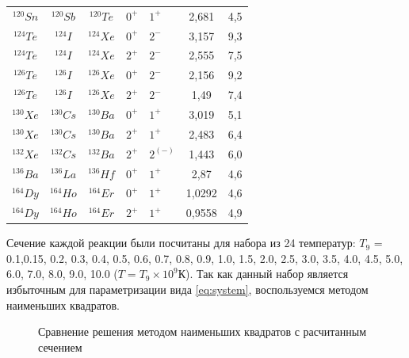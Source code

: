 \documentclass[14pt, a4paper]{article}
\numberwithin{figure}{section}
\numberwithin{equation}{section}
\begin{document}
\begin{table}
\begin{tabular}{|c|c|c|HHc|c|}
		$^{120}Sn$ & $^{120}Sb$ &$^{120}Te$& $0^+$  &  $1^+$  & 2,681 &   4,5   \\
		$^{124}Te$ & $^{124}I$  &$^{124}Xe$& $0^+$  &  $2^-$  & 3,157 &   9,3   \\
		$^{124}Te$ & $^{124}I$  &$^{124}Xe$& $2^+$  &  $2^-$  & 2,555 &   7,5   \\
		$^{126}Te$ & $^{126}I$  &$^{126}Xe$& $0^+$  &  $2^-$  & 2,156 &   9,2   \\
		$^{126}Te$ & $^{126}I$ &$^{126}Xe$ & $2^+$  &  $2^-$  & 1,49 &   7,4   \\
		$^{130}Xe$ & $^{130}Cs$ &$^{130}Ba$& $0^+$  &  $1^+$  & 3,019 &   5,1   \\
		$^{130}Xe$ & $^{130}Cs$ &$^{130}Ba$& $2^+$  &  $1^+$  & 2,483 &   6,4   \\
		$^{132}Xe$ & $^{132}Cs$ &$^{132}Ba$& $2^+$  &  $2^{(-)}$  & 1,443 &   6,0   \\
		$^{136}Ba$ & $^{136}La$ &$^{136}Hf$& $0^+$  &  $1^+$  & 2,87 &   4,6   \\
		$^{164}Dy$ & $^{164}Ho$ &$^{164}Er$& $0^+$  &  $1^+$  & 1,0292 &   4,6   \\
		$^{164}Dy$ & $^{164}Ho$ &$^{164}Er$& $2^+$  &  $1^+$  & 0,9558 &   4,9   \\
		\hline
	\end{tabular}
	\label{Tels}
\end{table}

Сечение каждой реакции были посчитаны для набора из 24 температур: $T_9$ = 0.1,0.15, 0.2, 0.3, 0.4, 0.5, 0.6, 0.7, 0.8, 0.9, 1.0, 1.5, 2.0, 2.5, 3.0, 3.5, 4.0, 4.5, 5.0, 6.0, 7.0, 8.0, 9.0, 10.0 ($T = T_9 \times 10^{9}\text{К}$). Так как данный набор является избыточным для параметризации вида \ref{eq:system}, воспользуемся методом наименьших квадратов. 

\begin{figure}[ht]
	\caption{Сравнение решения методом наименьших квадратов с расчитанным сечением}
	\label{ris:2}
\end{figure}
\end{document}

